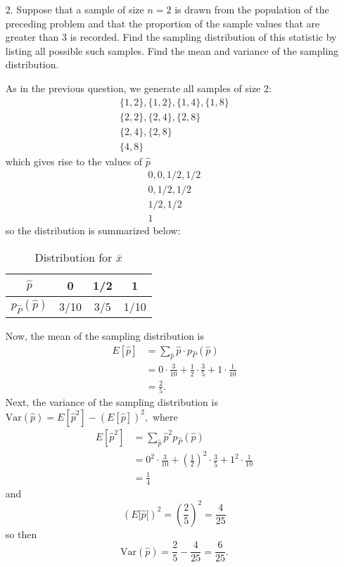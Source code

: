 \documentclass{article}
\newcommand{\var}{\mathrm{Var}}
\begin{document}
\begin{itemize}
	
	\newpage

	\item[2.] Suppose that a sample of size $n=2$ is drawn from the population of the preceding problem and that the proportion of the sample values that are greater than 3 is recorded. Find the sampling distribution of this statistic by listing all possible such samples. Find the mean and variance of the sampling distribution.
		\begin{soln}
			As in the previous question, we generate all samples of size 2:
			\begin{align*}
				\{1, 2\}, \{1, 2\}, \{1, 4\}, \{1, 8\} \\
				\{2, 2\}, \{2, 4\}, \{2, 8\} \\
				\{2, 4\}, \{2, 8\} \\
				\{4, 8\}
			\end{align*} which gives rise to the values of $\hat{p}$ 
			\begin{align*}
				0, 0, 1/2, 1/2 \\
				0, 1/2, 1/2 \\
				1/2, 1/2 \\
				1
			\end{align*}
			so the distribution is summarized below:
			\begin{center}
				\begin{table}[h!]
					\centering
					\caption{Distribution for $\bar{x}$}

					\begin{tabular}{c|ccc}
						$\hat{p}$ & 0 & 1/2 & 1 \\ 
						\hline
						$p_{\hat{P}}(\hat{p})$ & 3/10 & 3/5 & 1/10
					\end{tabular}

				\end{table}
			\end{center}
			Now, the mean of the sampling distribution is 
			\begin{align*}
				E[\hat{p}]&=\sum_{\hat{p}} \hat{p}\cdot p_{\hat{P}} (\hat{p}) \\
				&= 0\cdot\frac{3}{10} + \frac{1}{2}\cdot\frac{3}{5} + 1\cdot\frac{1}{10} \\
				&= \boxed{\frac{2}{5}.}
			\end{align*}
			Next, the variance of the sampling distribution is $\var(\hat{p}) = E[\hat{p}^2]-(E[\hat{p}])^2,$ where 
			\begin{align*}
				E[\hat{p}^2] &= \sum_{\hat{p}} \hat{p}^2 p_{\hat{P}}(\hat{p}) \\
				&= 0^2\cdot\frac{3}{10} + \left( \frac{1}{2} \right)^2\cdot\frac{3}{5} + 1^2\cdot\frac{1}{10} \\
				&= \frac{1}{4}
			\end{align*} and \[(E[\hat{p}[)^2 = \left( \frac{2}{5} \right)^2 = \frac{4}{25}\] so then \[\var(\hat{p}) = \frac{2}{5} - \frac{4}{25} = \boxed{\frac{6}{25}.}\]



\end{soln}
\end{itemize}
\end{document}
